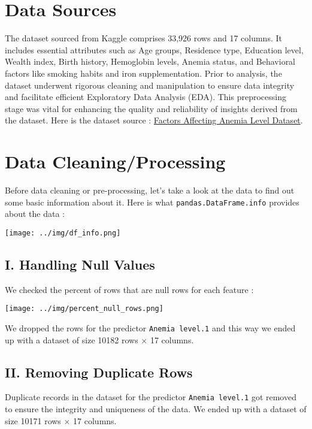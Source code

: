 \section{Data Sources}

The dataset sourced from Kaggle comprises 33,926 rows and 17 columns. It includes essential attributes such as Age groups, Residence type, Education level, Wealth index, Birth history, Hemoglobin levels, Anemia status, and Behavioral factors like smoking habits and iron supplementation. Prior to analysis, the dataset underwent rigorous cleaning and manipulation to ensure data integrity and facilitate efficient Exploratory Data Analysis (EDA). This preprocessing stage was vital for enhancing the quality and reliability of insights derived from the dataset. Here is the dataset source :
\href{https://www.kaggle.com/datasets/adeolaadesina/factors-affecting-children-anemia-level/data}{Factors Affecting Anemia Level Dataset}.






\section{Data Cleaning/Processing}

Before data cleaning or pre-processing, let's take a look at the data to find out some basic information about it. Here is what \texttt{pandas.DataFrame.info} provides about the data :

\texttt{[image: ../img/df\_info.png]}


\subsection{I. Handling Null Values}

We checked the percent of rows that are null rows for each feature :

\texttt{[image: ../img/percent\_null\_rows.png]}

We dropped the rows for the predictor \texttt{Anemia level.1} and this way we ended up with a dataset of size 10182 rows × 17 columns.






\subsection{II. Removing Duplicate Rows}
Duplicate records in the dataset for the predictor \texttt{Anemia level.1} got removed to ensure the integrity and uniqueness of the data. We ended up with a dataset of size 10171 rows × 17 columns.

